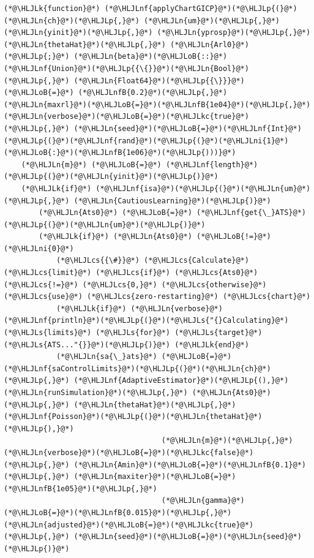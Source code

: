 \documentclass[12pt,a4paper]{article}
\newcommand{\HLJLk}[1]{\textcolor[RGB]{148,91,176}{\textbf{#1}}}
\newcommand{\HLJLkc}[1]{\textcolor[RGB]{59,151,46}{\textit{#1}}}
\newcommand{\HLJLn}[1]{#1}
\newcommand{\HLJLnf}[1]{\textcolor[RGB]{66,102,213}{#1}}
\newcommand{\HLJLs}[1]{\textcolor[RGB]{201,61,57}{#1}}
\newcommand{\HLJLnfB}[1]{\textcolor[RGB]{59,151,46}{#1}}
\newcommand{\HLJLni}[1]{\textcolor[RGB]{59,151,46}{#1}}
\newcommand{\HLJLoB}[1]{\textcolor[RGB]{102,102,102}{\textbf{#1}}}
\newcommand{\HLJLp}[1]{#1}
\newcommand{\HLJLcs}[1]{\textcolor[RGB]{153,153,119}{\textit{#1}}}
\begin{document}
\begin{lstlisting}
(*@\HLJLk{function}@*) (*@\HLJLnf{applyChartGICP}@*)(*@\HLJLp{(}@*)(*@\HLJLn{ch}@*)(*@\HLJLp{,}@*) (*@\HLJLn{um}@*)(*@\HLJLp{,}@*) (*@\HLJLn{yinit}@*)(*@\HLJLp{,}@*) (*@\HLJLn{yprosp}@*)(*@\HLJLp{,}@*) (*@\HLJLn{thetaHat}@*)(*@\HLJLp{,}@*) (*@\HLJLn{Arl0}@*)(*@\HLJLp{;}@*) (*@\HLJLn{beta}@*)(*@\HLJLoB{::}@*)(*@\HLJLnf{Union}@*)(*@\HLJLp{{\{}}@*)(*@\HLJLn{Bool}@*)(*@\HLJLp{,}@*) (*@\HLJLn{Float64}@*)(*@\HLJLp{{\}}}@*) (*@\HLJLoB{=}@*) (*@\HLJLnfB{0.2}@*)(*@\HLJLp{,}@*) (*@\HLJLn{maxrl}@*)(*@\HLJLoB{=}@*)(*@\HLJLnfB{1e04}@*)(*@\HLJLp{,}@*) (*@\HLJLn{verbose}@*)(*@\HLJLoB{=}@*)(*@\HLJLkc{true}@*)(*@\HLJLp{,}@*) (*@\HLJLn{seed}@*)(*@\HLJLoB{=}@*)(*@\HLJLnf{Int}@*)(*@\HLJLp{(}@*)(*@\HLJLnf{rand}@*)(*@\HLJLp{(}@*)(*@\HLJLni{1}@*)(*@\HLJLoB{:}@*)(*@\HLJLnfB{1e06}@*)(*@\HLJLp{)))}@*)
    (*@\HLJLn{m}@*) (*@\HLJLoB{=}@*) (*@\HLJLnf{length}@*)(*@\HLJLp{(}@*)(*@\HLJLn{yinit}@*)(*@\HLJLp{)}@*)
    (*@\HLJLk{if}@*) (*@\HLJLnf{isa}@*)(*@\HLJLp{(}@*)(*@\HLJLn{um}@*)(*@\HLJLp{,}@*) (*@\HLJLn{CautiousLearning}@*)(*@\HLJLp{)}@*)
        (*@\HLJLn{Ats0}@*) (*@\HLJLoB{=}@*) (*@\HLJLnf{get{\_}ATS}@*)(*@\HLJLp{(}@*)(*@\HLJLn{um}@*)(*@\HLJLp{)}@*)
        (*@\HLJLk{if}@*) (*@\HLJLn{Ats0}@*) (*@\HLJLoB{!=}@*) (*@\HLJLni{0}@*)
            (*@\HLJLcs{{\#}}@*) (*@\HLJLcs{Calculate}@*) (*@\HLJLcs{limit}@*) (*@\HLJLcs{if}@*) (*@\HLJLcs{Ats0}@*) (*@\HLJLcs{!=}@*) (*@\HLJLcs{0,}@*) (*@\HLJLcs{otherwise}@*) (*@\HLJLcs{use}@*) (*@\HLJLcs{zero-restarting}@*) (*@\HLJLcs{chart}@*)
            (*@\HLJLk{if}@*) (*@\HLJLn{verbose}@*) (*@\HLJLnf{println}@*)(*@\HLJLp{(}@*)(*@\HLJLs{"{}Calculating}@*) (*@\HLJLs{limits}@*) (*@\HLJLs{for}@*) (*@\HLJLs{target}@*) (*@\HLJLs{ATS..."{}}@*)(*@\HLJLp{)}@*) (*@\HLJLk{end}@*)
            (*@\HLJLn{sa{\_}ats}@*) (*@\HLJLoB{=}@*) (*@\HLJLnf{saControlLimits}@*)(*@\HLJLp{(}@*)(*@\HLJLn{ch}@*)(*@\HLJLp{,}@*) (*@\HLJLnf{AdaptiveEstimator}@*)(*@\HLJLp{(),}@*) (*@\HLJLn{runSimulation}@*)(*@\HLJLp{,}@*) (*@\HLJLn{Ats0}@*)(*@\HLJLp{,}@*) (*@\HLJLn{thetaHat}@*)(*@\HLJLp{,}@*) (*@\HLJLnf{Poisson}@*)(*@\HLJLp{(}@*)(*@\HLJLn{thetaHat}@*)(*@\HLJLp{),}@*)
                                    (*@\HLJLn{m}@*)(*@\HLJLp{,}@*) (*@\HLJLn{verbose}@*)(*@\HLJLoB{=}@*)(*@\HLJLkc{false}@*)(*@\HLJLp{,}@*) (*@\HLJLn{Amin}@*)(*@\HLJLoB{=}@*)(*@\HLJLnfB{0.1}@*)(*@\HLJLp{,}@*) (*@\HLJLn{maxiter}@*)(*@\HLJLoB{=}@*)(*@\HLJLnfB{1e05}@*)(*@\HLJLp{,}@*)
                                    (*@\HLJLn{gamma}@*)(*@\HLJLoB{=}@*)(*@\HLJLnfB{0.015}@*)(*@\HLJLp{,}@*) (*@\HLJLn{adjusted}@*)(*@\HLJLoB{=}@*)(*@\HLJLkc{true}@*)(*@\HLJLp{,}@*) (*@\HLJLn{seed}@*)(*@\HLJLoB{=}@*)(*@\HLJLn{seed}@*)(*@\HLJLp{)}@*)

\end{lstlisting}
\end{document}

